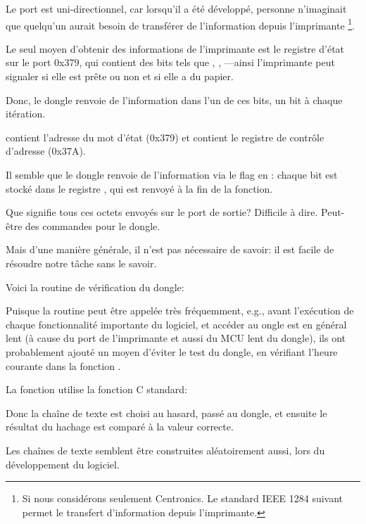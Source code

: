 Le port est uni-directionnel, car lorsqu'il a été développé, personne n'imaginait
que quelqu'un aurait besoin de transférer de l'information depuis l'imprimante
\footnote{Si nous considérons seulement Centronics. Le standard IEEE 1284 suivant
permet le transfert d'information depuis l'imprimante.}.

Le seul moyen d'obtenir des informations de l'imprimante est le registre d'état sur
le port 0x379, qui contient des bits tels que , , ---ainsi
l'imprimante peut signaler si elle est prête ou non et si elle a du papier.

Donc, le dongle renvoie de l'information dans l'un de ces bits, un bit à chaque itération.

 contient l'adresse du mot d'état (0x379) et  contient
le registre de contrôle d'adresse (0x37A).

Il semble que le dongle renvoie de l'information via le flag  en :
chaque bit est stocké dans le registre , qui est renvoyé à la fin de la fonction.

Que signifie tous ces octets envoyés sur le port de sortie?
Difficile à dire. Peut-être des commandes pour le dongle.

Mais d'une manière générale, il n'est pas nécessaire de savoir: il est facile de
résoudre notre tâche sans le savoir.

Voici la routine de vérification du dongle:



Puisque la routine peut être appelée très fréquemment, e.g., avant l'exécution de
chaque fonctionnalité importante du logiciel, et accéder au ongle est en général
lent (à cause du port de l'imprimante et aussi du \ac{MCU} lent du dongle), ils ont
probablement ajouté un moyen d'éviter le test du dongle, en vérifiant l'heure courante
dans la fonction .

La fonction  utilise la fonction C standard:



Donc la chaîne de texte est choisi au hasard, passé au dongle, et ensuite le résultat
du hachage est comparé à la valeur correcte.

Les chaînes de texte semblent être construites aléatoirement aussi, lors du développement
du logiciel.

